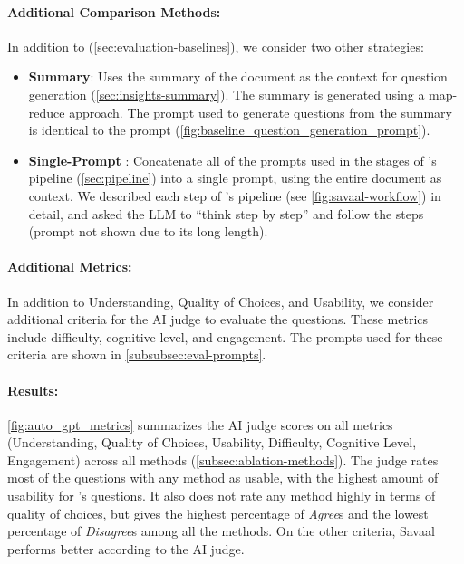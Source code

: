 \paragraph{Additional Comparison Methods:}
\label{subsec:ablation-methods}
In addition to \Baseline (\autoref{sec:evaluation-baselines}), we consider two other strategies:
\begin{itemize}[topsep=1pt, itemsep=0pt, leftmargin=*]

    
    \item \textbf{Summary}: Uses the summary of the document as the context for question generation (\autoref{sec:insights-summary}). The summary is generated using a map-reduce approach. The prompt used to generate questions from the summary is identical to the \Baseline prompt (\autoref{fig:baseline_question_generation_prompt}). 
    


    \item \textbf{Single-Prompt \TheSystem}: Concatenate all of the prompts used in the stages of \name's pipeline (\autoref{sec:pipeline}) into a single prompt, using the entire document as context. We described each step of \name's pipeline (see \autoref{fig:savaal-workflow}) in detail, and asked the LLM to ``think step by step'' and follow the steps (prompt not shown due to its long length).
    
\end{itemize}

\paragraph{Additional Metrics:}
\label{subsec:ablation-metrics}
In addition to Understanding, Quality of Choices, and Usability, we consider additional criteria for the AI judge to evaluate the questions. These metrics include difficulty, cognitive level, and engagement. The prompts used for these criteria are shown in \autoref{subsubsec:eval-prompts}.

\paragraph{Results:} \autoref{fig:auto_gpt_metrics} summarizes the AI judge scores on all metrics (Understanding, Quality of Choices, Usability, Difficulty, Cognitive Level, Engagement) across all methods (\autoref{subsec:ablation-methods}). The judge rates most of the questions with any method as usable, with the highest amount of usability for \name's questions. It also does not rate any method highly in terms of quality of choices, but gives \name the highest percentage of \emph{Agree}s and the lowest percentage of \emph{Disagree}s among all the methods. On the other criteria, Savaal performs better according to the AI judge.


